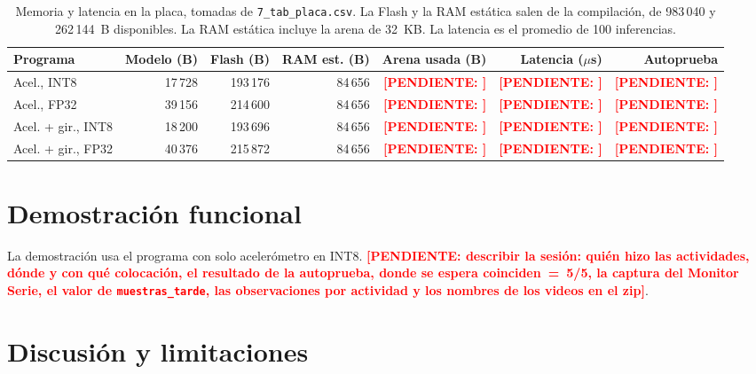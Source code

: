 \documentclass[11pt,a4paper]{article}
\newcommand{\pendiente}[1]{\textcolor{red}{\textbf{[PENDIENTE: #1]}}}
\begin{document}
\begin{table}[htbp]
\centering\small
\begin{tabular}{lrrrrrr}
\toprule
Programa & Modelo (B) & Flash (B) & RAM est. (B) & Arena usada (B) & Latencia ($\mu$s) & Autoprueba \\
\midrule
Acel., INT8 & 17\,728 & 193\,176 & 84\,656 & \pendiente{} & \pendiente{} & \pendiente{} \\
Acel., FP32 & 39\,156 & 214\,600 & 84\,656 & \pendiente{} & \pendiente{} & \pendiente{} \\
Acel. + gir., INT8 & 18\,200 & 193\,696 & 84\,656 & \pendiente{} & \pendiente{} & \pendiente{} \\
Acel. + gir., FP32 & 40\,376 & 215\,872 & 84\,656 & \pendiente{} & \pendiente{} & \pendiente{} \\
\bottomrule
\end{tabular}
\caption{Memoria y latencia en la placa, tomadas de \texttt{7\_tab\_placa.csv}. La Flash y la RAM estática salen de la compilación, de 983\,040 y 262\,144~B disponibles. La RAM estática incluye la arena de 32~KB. La latencia es el promedio de 100 inferencias.}
\label{tab:placa}
\end{table}

\section{Demostración funcional}

La demostración usa el programa con solo acelerómetro en INT8. \pendiente{describir la sesión: quién hizo las actividades, dónde y con qué colocación, el resultado de la autoprueba, donde se espera coinciden~=~5/5, la captura del Monitor Serie, el valor de \texttt{muestras\_tarde}, las observaciones por actividad y los nombres de los videos en el zip}.

\section{Discusión y limitaciones}
\end{document}
